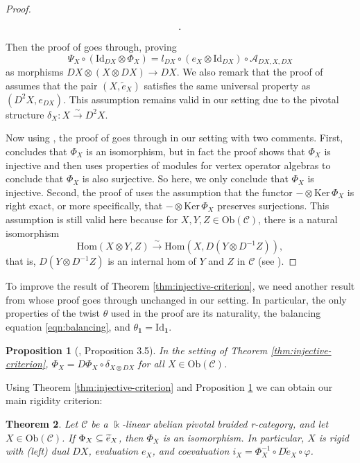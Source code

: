 \documentclass[11pt, reqno]{amsart}
\newtheorem{thm}{Theorem}[section]
\newtheorem{prop}[thm]{Proposition}
\theoremstyle{definition}\newtheorem{defi}[thm]{Definition}
\theoremstyle{definition}\newtheorem{rem}[thm]{Remark}
\theoremstyle{definition}\newtheorem{exam}[thm]{Example}
\theoremstyle{definition}\newtheorem{assum}[thm]{Assumption}
\newcommand{\cA}{\mathcal{A}}
\newcommand{\cC}{\mathcal{C}}
\newcommand{\til}{\widetilde}
\newcommand{\Id}{\mathrm{Id}}
\newcommand{\vac}{\mathbf{1}}
\let\ker\relax
\DeclareMathOperator{\ker}{Ker}
\begin{document}
\begin{proof}
\begin{equation*}
\begin{matrix}
\begin{tikzpicture}[scale = 1, baseline = {(current bounding box.center)}, line width=0.75pt]
    \end{tikzpicture}
   \end{matrix} .
\end{equation*}
Then the proof of \cite[Lemma 3.3(1)]{McR} goes through, proving
\begin{equation*}
\Psi_X\circ(\Id_{DX}\otimes\Phi_X) = l_{DX}\circ(e_X\otimes\Id_{DX})\circ\cA_{DX,X,DX}
\end{equation*}
as morphisms $DX\otimes(X\otimes DX)\rightarrow DX$. We also remark that the proof of \cite[Lemma 3.3(2)]{McR} assumes that the pair $(X,\til{e}_X)$ satisfies the same universal property as $(D^2X, e_{DX})$. This assumption remains valid in our setting due to the pivotal structure $\delta_X: X\xrightarrow{\sim} D^2X$.

Now using \cite[Lemma 3.3]{McR}, the proof of \cite[Theorem 3.4]{McR} goes through in our setting with two comments. First, \cite[Theorem 3.4]{McR} concludes that $\Phi_X$ is an isomorphism, but in fact the proof shows that $\Phi_X$ is injective and then uses properties of modules for vertex operator algebras to conclude that $\Phi_X$ is also surjective. So here, we only conclude that $\Phi_X$ is injective. Second, the proof of \cite[Theorem 3.4]{McR} uses the assumption that the functor $-\otimes\mathrm{Ker}\,\Phi_X$ is right exact, or more specifically, that $-\otimes\mathrm{Ker}\,\Phi_X$ preserves surjections. This assumption is still valid here because for $X,Y,Z\in\mathrm{Ob}(\cC)$, there is a natural isomorphism
\begin{equation*}
\mathrm{Hom}(X\otimes Y,Z)\xrightarrow{\sim}\mathrm{Hom}(X,D(Y\otimes D^{-1}Z)),
\end{equation*}
that is, $D(Y\otimes D^{-1}Z)$ is an internal hom of $Y$ and $Z$ in $\cC$ (see \cite[Remark 1.1(iii)]{BD}).
\end{proof}

To improve the result of Theorem \ref{thm:injective-criterion}, we need another result from \cite{McR} whose proof goes through unchanged in our setting. In particular, the only properties of the twist $\theta$ used in the proof are its naturality, the balancing equation \eqref{eqn:balancing}, and $\theta_\vac=\Id_\vac$.
\begin{prop}[\cite{McR}, Proposition 3.5]\label{prop:Phi-dual}
In the setting of Theorem \ref{thm:injective-criterion}, $\Phi_X = D\Phi_X\circ\delta_{X\otimes DX}$ for all $X\in\mathrm{Ob}(\cC)$.
\end{prop}

Using Theorem \ref{thm:injective-criterion} and Proposition \ref{prop:Phi-dual} we can obtain our main rigidity criterion:
\begin{thm}\label{thm:rigidity-criterion}
Let $\cC$ be a $\Bbbk$-linear abelian pivotal braided r-category, and let $X\in\mathrm{Ob}(\cC)$. If $\ker\Phi_X\subseteq\ker\til{e}_X$, then $\Phi_X$ is an isomorphism. In particular, $X$ is rigid with (left) dual $DX$, evaluation $e_X$, and coevaluation $i_X=\Phi_X^{-1}\circ D\til{e}_X\circ\varphi$.
\end{thm}
\end{document}
